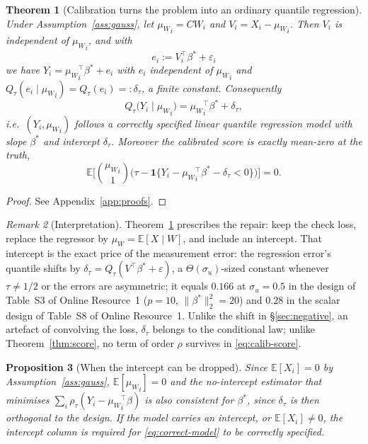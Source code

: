 \documentclass[12pt,a4paper]{article}
\newtheorem{theorem}{Theorem}[section]
\newtheorem{proposition}[theorem]{Proposition}
\theoremstyle{definition}
\theoremstyle{remark}
\newtheorem{remark}[theorem]{Remark}
\newcommand{\E}{\mathbb{E}}
\newcommand{\ind}[1]{\mathbf{1}\{#1\}}
\newcommand{\norm}[1]{\|#1\|}
\newcommand{\betas}{\beta^*}
\newcommand{\muv}{\mu_W}
\newcommand{\Ccal}{C}
\begin{document}
\begin{theorem}[Calibration turns the problem into an ordinary quantile regression]
\label{thm:calib}
Under Assumption~\ref{ass:gauss}, let ${\muv}_i = \Ccal W_i$ and $V_i = X_i-{\muv}_i$. Then
$V_i$ is independent of ${\muv}_i$, and with
\begin{equation}
e_i := V_i^\top\betas + \varepsilon_i
\end{equation}
we have $Y_i = {\muv}_i^\top\betas + e_i$ with $e_i$ independent of ${\muv}_i$ and
$Q_\tau(e_i\mid{\muv}_i) = Q_\tau(e_i) =: \delta_\tau$, a finite constant. Consequently
\begin{equation}
Q_\tau\big(Y_i\mid{\muv}_i\big) = {\muv}_i^\top\betas + \delta_\tau ,
\label{eq:correct-model}
\end{equation}
i.e.\ $(Y_i,{\muv}_i)$ follows a correctly specified linear quantile regression model with
slope $\betas$ and intercept $\delta_\tau$. Moreover the calibrated score is exactly
mean-zero at the truth,
\begin{equation}
\E\Big[\binom{{\muv}_i}{1}\Big(\tau-\ind{Y_i-{\muv}_i^\top\betas-\delta_\tau<0}\Big)\Big] = 0 .
\label{eq:calib-score}
\end{equation}
\end{theorem}

\begin{proof}
See Appendix~\ref{app:proofs}.
\end{proof}

\begin{remark}[Interpretation]
Theorem~\ref{thm:calib} prescribes the repair: keep the check loss, replace the regressor by
$\muv = \E[X\mid W]$, and include an intercept. That intercept is the exact price of the
measurement error: the regression error's quantile shifts by
$\delta_\tau = Q_\tau(V^\top\betas+\varepsilon)$, a $\Theta(\sigma_u)$-sized constant
whenever $\tau\neq1/2$ or the errors are asymmetric; it equals $0.166$ at $\sigma_u=0.5$ in
the design of Table~S3 of Online Resource~1 ($p=10$, $\norm{\betas}_2^2=20$) and $0.28$ in
the scalar design of Table~S8 of Online Resource~1. Unlike the shift in \S\ref{sec:negative}, an
artefact of convolving the loss, $\delta_\tau$ belongs to the conditional law; unlike
Theorem~\ref{thm:score}, no term of order $\rho$ survives in \eqref{eq:calib-score}.
\end{remark}

\begin{proposition}[When the intercept can be dropped]
\label{prop:intercept}
Since $\E[X_i]=0$ by Assumption~\ref{ass:gauss}, $\E[{\muv}_i]=0$ and the
no-intercept estimator that
minimises $\sum_i\rho_\tau(Y_i-{\muv}_i^\top\beta)$ is also consistent for $\betas$, since
$\delta_\tau$ is then orthogonal to the design. If the model carries an intercept, or
$\E[X_i]\neq0$, the intercept column is required for \eqref{eq:correct-model} to be
correctly specified.
\end{proposition}
\end{document}
